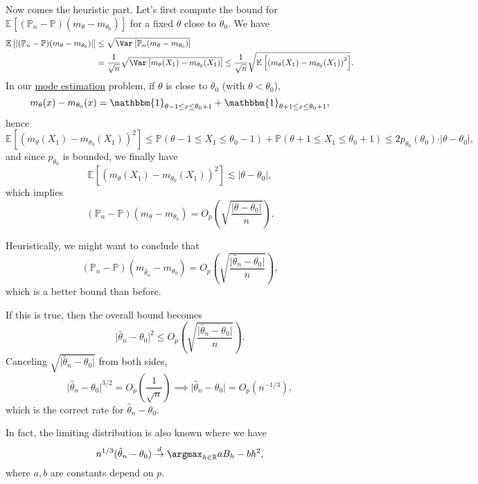 Now comes the heuristic part. Let's first compute the bound for \(\mathbb{E}_{}\left[(\mathbb{P} _n - \mathbb{P} ) (m_\theta - m_{\theta _0})\right] \) for a fixed \(\theta \) close to \(\theta _0\). We have
\[
	\begin{split}
		\mathbb{E}_{}\left[\vert (\mathbb{P} _n - \mathbb{P} ) (m_\theta - m_{\theta _0}) \vert \right]
		&\leq \sqrt{\Var_{}\left[\mathbb{P} _n(m_\theta - m_{\theta _0}) \right] } \\
		&= \frac{1}{\sqrt{n} } \sqrt{\Var_{}\left[m_\theta (X_1) - m_{\theta _0}(X_1) \right] }
		\leq \frac{1}{\sqrt{n} } \sqrt{\mathbb{E}_{}\left[\left( m_\theta (X_1) - m_{\theta _0}(X_1) \right) ^2 \right] } .
	\end{split}
\]
In our \hyperref[eg:mode-estimation]{mode estimation} problem, if \(\theta \) is close to \(\theta _0\) (with \(\theta < \theta _0\)),
\[
	m_\theta (x) - m_{\theta _0}(x)
	= \mathbbm{1}_{\theta -1 \leq x \leq \theta _0 + 1} + \mathbbm{1}_{\theta +1 \leq x \leq \theta _0 + 1},
\]
hence
\[
	\mathbb{E}_{}\left[\left( m_\theta (X_1) - m_{\theta _0}(X_1) \right) ^2 \right]
	\leq \mathbb{P} (\theta -1 \leq X_1 \leq \theta _0 - 1) + \mathbb{P} (\theta +1 \leq X_1 \leq \theta _0 + 1)
	\leq 2 p_{\theta _0}(\theta _0) \cdot \vert \theta - \theta _0 \vert,
\]
and since \(p_{\theta _0}\) is bounded, we finally have
\[
	\mathbb{E}_{}\left[\left( m_\theta (X_1) - m_{\theta _0}(X_1) \right) ^2 \right]
	\lesssim \vert \theta - \theta _0 \vert,
\]
which implies
\[
	(\mathbb{P} _n - \mathbb{P} )(m_\theta - m_{\theta _0})
	= O_p \left( \sqrt{\frac{\vert \theta - \theta _0 \vert }{n}} \right) .
\]

\begin{intuition}[Heuristic]
	Heuristically, we might want to conclude that
	\[
		(\mathbb{P} _n - \mathbb{P} ) (m_{\hat{\theta } _n } - m_{\theta _0})
		= O_p \left( \sqrt{\frac{\vert \hat{\theta } _n - \theta _0 \vert}{n}} \right),
	\]
	which is a better bound than before.
\end{intuition}

If this is true, then the overall bound becomes
\[
	\vert \hat{\theta } _n - \theta _0 \vert ^2
	\leq O_p \left( \sqrt{\frac{\vert \hat{\theta } _n - \theta _0 \vert}{n}} \right) .
\]
Canceling \(\sqrt{\vert \hat{\theta } _n - \theta _0 \vert} \) from both sides,
\[
	\vert \hat{\theta } _n - \theta _0 \vert^{3 / 2} = O_p \left( \frac{1}{\sqrt{n} } \right)
	\implies \vert \hat{\theta } _n - \theta _0 \vert = O_p(n^{-1 / 3}),
\]
which is the correct rate for \(\hat{\theta } _n - \theta _0\).

\begin{remark}
	In fact, the limiting distribution is also known where we have
	\[
		n^{1 / 3} (\hat{\theta } _n - \theta _0) \overset{d}{\to } \argmax_{h\in \mathbb{R} } aB_h - b h^2,
	\]
	where \(a, b\) are constants depend on \(p\).
\end{remark}